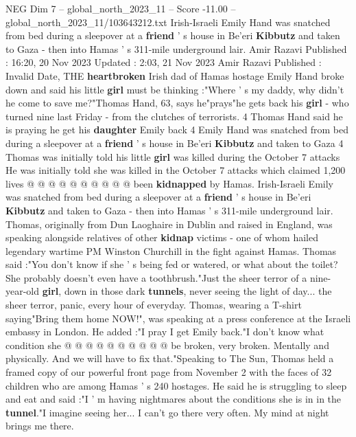 \begin{textsample}{NEG Dim 7 – global\_north\_2023\_11 – Score -11.00 – global\_north\_2023\_11/103643212.txt}  \label{ex:f7_neg_041}
Irish-Israeli Emily Hand was snatched from bed during a sleepover at a \textbf{friend} ' s house in Be'eri \textbf{Kibbutz} and taken to Gaza - then into Hamas ' s 311-mile underground lair.
Amir Razavi Published : 16:20, 20 Nov 2023 Updated : 2:03, 21 Nov 2023 Amir Razavi Published : Invalid Date, THE \textbf{heartbroken} Irish dad of Hamas hostage Emily Hand broke down and said his little \textbf{girl} must be thinking :"Where ' s my daddy, why didn't he come to save me?"Thomas Hand, 63, says he"prays"he gets back his \textbf{girl} - who turned nine last Friday - from the clutches of terrorists. 4 Thomas Hand said he is praying he get his \textbf{daughter} Emily back 4 Emily Hand was snatched from bed during a sleepover at a \textbf{friend} ' s house in Be'eri \textbf{Kibbutz} and taken to Gaza 4 Thomas was initially told his little \textbf{girl} was killed during the October 7 attacks He was initially told she was killed in the October 7 attacks which claimed 1,200 lives @ @ @ @ @ @ @ @ @ @ been \textbf{kidnapped} by Hamas.
Irish-Israeli Emily was snatched from bed during a sleepover at a \textbf{friend} ' s house in Be'eri \textbf{Kibbutz} and taken to Gaza - then into Hamas ' s 311-mile underground lair.
Thomas, originally from Dun Laoghaire in Dublin and raised in England, was speaking alongside relatives of other \textbf{kidnap} victims - one of whom hailed legendary wartime PM Winston Churchill in the fight against Hamas.
Thomas said :"You don't know if she ' s being fed or watered, or what about the toilet?
She probably doesn't even have a toothbrush."Just the sheer terror of a nine-year-old \textbf{girl}, down in those dark \textbf{tunnels}, never seeing the light of day... the sheer terror, panic, every hour of everyday.
Thomas, wearing a T-shirt saying"Bring them home NOW!", was speaking at a press conference at the Israeli embassy in London.
He added :"I pray I get Emily back."I don't know what condition she @ @ @ @ @ @ @ @ @ @ be broken, very broken.
Mentally and physically.
And we will have to fix that."Speaking to The Sun, Thomas held a framed copy of our powerful front page from November 2 with the faces of 32 children who are among Hamas ' s 240 hostages.
He said he is struggling to sleep and eat and said :"I ' m having nightmares about the conditions she is in in the \textbf{tunnel}."I imagine seeing her...
I can't go there very often.
My mind at night brings me there.

\end{textsample}
